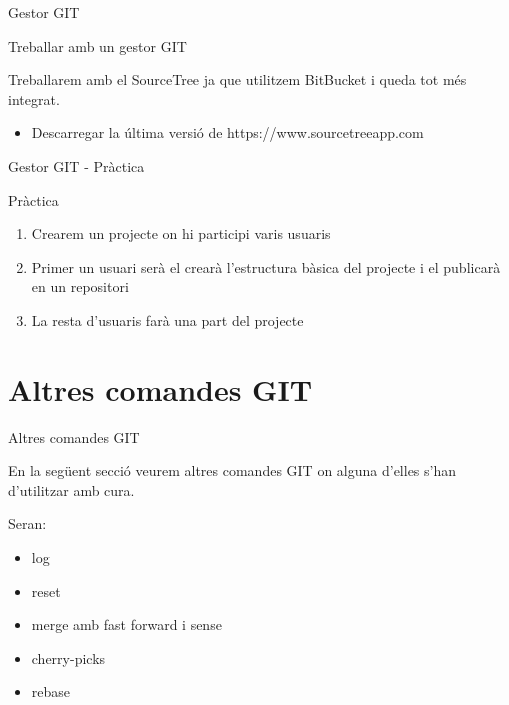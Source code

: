 \documentclass[10pt,xcolor={rgb}]{beamer}
\begin{document}
        
    \begin{frame}[fragile]{Gestor GIT}
      \begin{block}{Treballar amb un gestor GIT}

        Treballarem amb el SourceTree ja que utilitzem BitBucket i queda tot més integrat.
        \begin{itemize}
          \item Descarregar la última versió de https://www.sourcetreeapp.com
        \end{itemize}

      \end{block}
    \end{frame}

    \begin{frame}[fragile]{Gestor GIT - Pràctica}
      \begin{block}{Pràctica}

        \begin{enumerate}
          \item Crearem un projecte on hi participi varis usuaris
          \item Primer un usuari serà el crearà l'estructura bàsica del projecte i el publicarà en un repositori
          \item La resta d'usuaris farà una part del projecte
        \end{enumerate}

      \end{block}
    \end{frame}


    \section{Altres comandes GIT}
    
    \begin{frame}[fragile]{Altres comandes GIT}

      En la següent secció veurem altres comandes GIT on alguna d'elles s'han d'utilitzar amb cura.
      \begin{block}{Seran:}
      \begin{itemize}
        \item log
        \item reset
        \item merge amb fast forward i sense
        \item cherry-picks
        \item rebase
      \end{itemize}
      \end{block}
    \end{frame}
    
\end{document}
